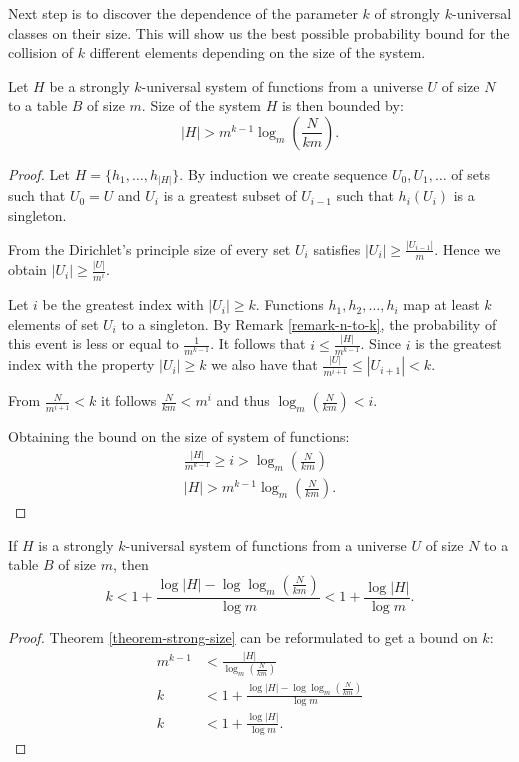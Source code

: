 Next step is to discover the dependence of the parameter $k$ of strongly $k$-universal classes on their size. This will show us the best possible probability bound for the collision of $k$ different elements depending on the size of the system.
\begin{theorem}
\label{theorem-strong-size}
Let $H$ be a strongly $k$-universal system of functions from a universe $U$ of size $N$ to a table $B$ of size $m$. Size of the system $H$ is then bounded by:
\begin{displaymath}
|H| > m^{k - 1} \log_m \left( \frac{N}{km} \right) \text{.}
\end{displaymath}
\end{theorem}
\begin{proof}
Let $H = \{h_1, \dots, h_{|H|}\}$. By induction we create sequence $U_0, U_1, \dots$ of sets such that $U_0 = U$ and $U_i$ is a greatest subset of $U_{i - 1}$ such that $h_i(U_i)$ is a singleton. 

From the Dirichlet's principle size of every set $U_i$ satisfies $|U_i| \geq \frac{|U_{i - 1}|}{m}$. Hence we obtain $|U_i| \geq \frac{|U|}{m^i}$.

Let $i$ be the greatest index with $|U_i| \geq k$. Functions $h_1, h_2,\dots, h_i$ map at least $k$ elements of set $U_i$ to a singleton. By Remark \ref{remark-n-to-k}, the probability of this event is less or equal to $\frac{1}{m ^ {k-1}}$. It follows that $i \leq \frac{|H|}{m ^ {k - 1}}$. Since $i$ is the greatest index with the property $|U_i| \geq k$ we also have that $\frac{|U|}{m ^ {i + 1}} \leq |U_{i + 1}| < k$. 

From $\frac{N}{m^{i + 1}} < k$ it follows $\frac{N}{km} < m ^ {i}$ and thus $\log_m \left( \frac{N}{km} \right) < i$.

Obtaining the bound on the size of system of functions:
\begin{gather*}
\frac{|H|}{m^{k - 1}} \geq i > \log_m \left( \frac{N}{km} \right) \\
|H| > m^{k - 1} \log_m \left( \frac{N}{km} \right) \text{.}
\end{gather*}
\end{proof}

\begin{corollary}
If $H$ is a strongly $k$-universal system of functions from a universe $U$ of size $N$ to a table $B$ of size $m$, then
\begin{displaymath}
k < 1 + \frac{\log |H| - \log \log_m \left( \frac{N}{km} \right)}{\log m} < 1 + \frac{\log |H|}{\log m} \text{.}
\end{displaymath}
\end{corollary}
\begin{proof}
Theorem \ref{theorem-strong-size} can be reformulated to get a bound on $k$:
\begin{displaymath}
\begin{split}
m^{k - 1} & < \frac{|H|}{\log_m \left( \frac{N}{km} \right)} \\
k & < 1 + \frac{\log |H| - \log \log_m \left( \frac{N}{km} \right)}{\log m} \\
k & < 1 + \frac{\log |H|}{\log m} \text{.}
\end{split}
\end{displaymath}
\end{proof}
